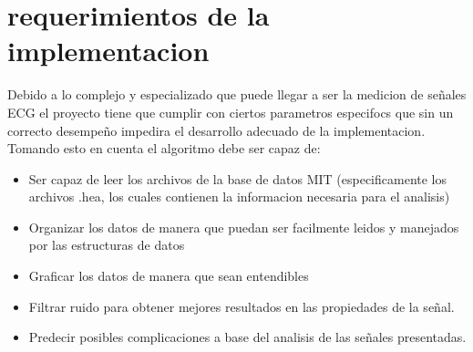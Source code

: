 \section{requerimientos de la implementacion}
\label{sec:metodologia}

Debido a lo complejo y especializado que puede llegar a ser la medicion de señales ECG el proyecto tiene que cumplir con ciertos parametros especifocs que sin un correcto desempeño impedira el desarrollo adecuado de la implementacion.
\\
Tomando esto en cuenta el algoritmo debe ser capaz de:

\begin{itemize}
 \item Ser capaz de leer los archivos de la base de datos MIT (especificamente los archivos .hea, los cuales contienen la informacion necesaria para el analisis) \cite{MIT-BIH}
 \item Organizar los datos de manera que puedan ser facilmente leidos y manejados por las estructuras de datos
 \item Graficar los datos de manera que sean entendibles
 \item Filtrar ruido para obtener mejores resultados en las propiedades de la señal.
 \item Predecir posibles complicaciones a base del analisis de las señales presentadas.
\end{itemize}
